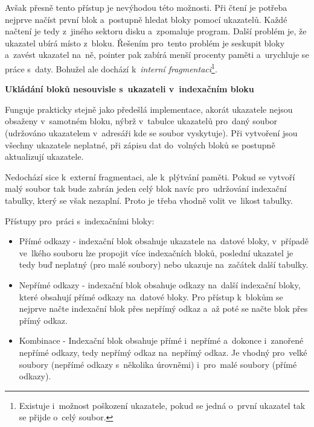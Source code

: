 \vspace{0,5cm}

Avšak přesně tento přístup je nevýhodou této možnosti. Při čtení je potřeba nejprve načíst první blok a~postupně hledat bloky pomocí ukazatelů. Každé načtení je tedy z~jiného sektoru disku a~zpomaluje program. Další problém je, že ukazatel ubírá místo z~bloku. Řešením pro~tento problém je seskupit bloky a~zavést ukazatel na~ně, pointer pak zabírá menší procenty paměti a~urychluje se práce s~daty. Bohužel ale dochází k~\emph{interní fragmentaci}\footnote{Existuje i~možnost poškození ukazatele, pokud se jedná o~první ukazatel tak se přijde o~celý soubor.}.

\begin{large}
    \vspace{0,5cm}
    \textbf{Ukládání bloků nesouvisle s~ukazateli v~indexačním bloku}
\end{large}

Funguje prakticky stejně jako předešlá implementace, akorát ukazatele nejsou obsaženy v~samotném bloku, nýbrž v~tabulce ukazatelů pro~daný soubor (udržováno ukazatelem v~adresáři kde se soubor vyskytuje). Při vytvoření jsou všechny ukazatele neplatné, při zápisu dat do~volných bloků se postupně aktualizují ukazatele. 

\vspace{0,5cm}

Nedochází sice k~externí fragmentaci, ale k~plýtvání paměti. Pokud se vytvoří malý soubor tak bude zabrán jeden celý blok navíc pro~udržování indexační tabulky, který se však nezaplní. Proto je třeba vhodně volit ve~likost tabulky.

\vspace{0,5cm}

Přístupy pro~práci s~indexačními bloky:
\begin{itemize}
    \item Přímé odkazy - indexační blok obsahuje ukazatele na~datové bloky, v~případě ve~lkého souboru lze propojit více indexačních bloků, poslední ukazatel je tedy buď neplatný (pro malé soubory) nebo ukazuje na~začátek další tabulky.
    \item Nepřímé odkazy - indexační blok obsahuje odkazy na~další indexační bloky, které obsahují přímé odkazy na~datové bloky. Pro přístup k~blokům se nejprve načte indexační blok přes nepřímý odkaz a~až poté se načte blok přes přímý odkaz. 
    \item Kombinace - Indexační blok obsahuje přímé i~nepřímé a~dokonce i~zanořené nepřímé odkazy, tedy nepřímý odkaz na~nepřímý odkaz. Je vhodný pro~velké soubory (nepřímé odkazy s~několika úrovněmi) i~pro~malé soubory (přímé odkazy).
\end{itemize}

